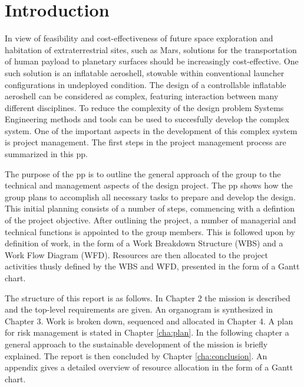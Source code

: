 \section{Introduction}\label{cha:introduction}
In view of feasibility and cost-effectiveness of future space exploration and habitation of extraterrestrial sites, such as Mars, solutions for the transportation of human payload to planetary surfaces should be increasingly cost-effective. One such solution is an inflatable aeroshell, stowable within conventional launcher configurations in undeployed condition. The design of a controllable inflatable aeroshell can be considered as complex, featuring interaction between many different disciplines. To reduce the complexity of the design problem Systems Engineering methods and tools can be used to succesfully develop the complex system. One of the important aspects in the development of this complex system is project management. The first steps in the project management process are summarized in this \gls{pp}.

The purpose of the \gls{pp} is to outline the general approach of the group to the technical and management aspects of the design project. The \gls{pp} shows how the group plans to accomplish all necessary tasks to prepare and develop the design. This initial planning consists of a number of steps, commencing with a defintion of the project objective. After outlining the project, a number of managerial and technical functions is appointed to the group members. This is followed upon by definition of work, in the form of a Work Breakdown Structure (WBS) and a Work Flow Diagram (WFD). Resources are then allocated to the project activities thusly defined by the WBS and WFD, presented in the form of a Gantt chart.

The structure of this report is as follows. In Chapter 2 the mission is described and the top-level requirements are given. An organogram is synthesized in Chapter 3. Work is broken down, sequenced and allocated in Chapter 4. A plan for risk management is stated in Chapter \ref{cha:plan}.  In the following chapter a general approach to the sustainable development of the mission is briefly explained. The report is then concluded by Chapter \ref{cha:conclusion}. An appendix gives a detailed overview of resource allocation in the form of a Gantt chart.
